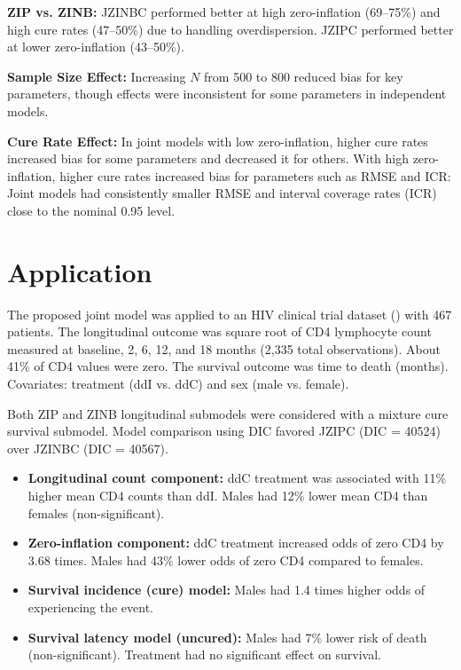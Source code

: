 \documentclass[twoside]{article}
\begin{document}
\textbf{ZIP vs. ZINB:} JZINBC performed better at high zero-inflation (69–75\%) and high cure rates (47–50\%) due to handling overdispersion. JZIPC performed better at lower zero-inflation (43–50\%).

\textbf{Sample Size Effect:} Increasing \( N \) from 500 to 800 reduced bias for key parameters, though effects were inconsistent for some parameters in independent models.

\textbf{Cure Rate Effect:} In joint models with low zero-inflation, higher cure rates increased bias for some parameters and decreased it for others. With high zero-inflation, higher cure rates increased bias for parameters such as RMSE and ICR: Joint models had consistently smaller RMSE and interval coverage rates (ICR) close to the nominal 0.95 level.

\section{Application}

The proposed joint model was applied to an HIV clinical trial dataset (\cite{Goldman:1996}) with 467 patients. The longitudinal outcome was square root of CD4 lymphocyte count measured at baseline, 2, 6, 12, and 18 months (2,335 total observations). About 41\% of CD4 values were zero. The survival outcome was time to death (months). Covariates: treatment (ddI vs. ddC) and sex (male vs. female).

Both ZIP and ZINB longitudinal submodels were considered with a mixture cure survival submodel. Model comparison using DIC favored JZIPC (DIC = 40524) over JZINBC (DIC = 40567).

\begin{itemize}
\item \textbf{Longitudinal count component:} ddC treatment was associated with 11\% higher mean CD4 counts than ddI. Males had 12\% lower mean CD4 than females (non-significant).
\item \textbf{Zero-inflation component:} ddC treatment increased odds of zero CD4 by 3.68 times. Males had 43\% lower odds of zero CD4 compared to females.
\item \textbf{Survival incidence (cure) model:} Males had 1.4 times higher odds of experiencing the event.
\item \textbf{Survival latency model (uncured):} Males had 7\% lower risk of death (non-significant). Treatment had no significant effect on survival.
\end{itemize}
\end{document}
